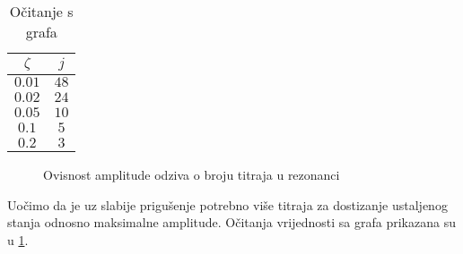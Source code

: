\par
\begin{minipage}[b][][l]{0.1\textwidth}
\begin{table}[H]
    \begin{tabular}{c | c}
       \hline
        $\zeta$ & $j$\\
        \hline
        $0.01$ & $48$\\
        \hline
        $0.02$ & $24$\\
        \hline
        $0.05$ & $10$\\
        \hline
        $0.1$ & $5$\\
        \hline
        $0.2$ & $3$\\
        \hline
    \end{tabular}
    \caption{Očitanje s grafa}
    \label{table:prirast-rezonanca-priguseno}
\end{table}
\end{minipage}
\hfill
\begin{minipage}[b][][r]{0.8\textwidth}
\begin{figure}[H]
    
    \label{fig:prirast-rezonanca-priguseno}
    \caption{Ovisnost amplitude odziva o broju titraja u rezonanci}
\end{figure}
\end{minipage}
\vspace{6pt}

Uočimo da je uz slabije prigušenje potrebno više titraja za dostizanje ustaljenog
stanja odnosno maksimalne amplitude. Očitanja vrijednosti sa grafa prikazana su u
\ref{table:prirast-rezonanca-priguseno}.


